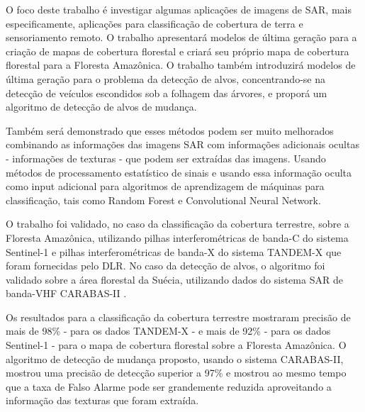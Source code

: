 O foco deste trabalho é investigar algumas aplicações de imagens de SAR, mais especificamente, aplicações para classificação de cobertura de terra e sensoriamento remoto.
O trabalho apresentará modelos de última geração para a criação de mapas de cobertura florestal e criará seu próprio mapa de cobertura florestal para a Floresta Amazônica.
O trabalho também introduzirá modelos de última geração para o problema da detecção de alvos, concentrando-se na detecção de veículos escondidos sob a folhagem das árvores, e proporá um algoritmo de detecção de alvos de mudança.

Também será demonstrado que esses métodos podem ser muito melhorados combinando as informações das imagens SAR com informações adicionais ocultas - informações de texturas - que podem ser extraídas das imagens.
Usando métodos de processamento estatístico de sinais e usando essa informação oculta como input adicional para algoritmos de aprendizagem de máquinas para classificação, tais como Random Forest e Convolutional Neural Network. 

O trabalho foi validado, no caso da classificação da cobertura terrestre, sobre a Floresta Amazônica, utilizando pilhas interferométricas de banda-C do sistema Sentinel-1 e pilhas interferométricas de banda-X do sistema TANDEM-X que foram fornecidas pelo DLR.
No caso da detecção de alvos, o algoritmo foi validado sobre a área florestal da Suécia, utilizando dados do sistema SAR de banda-VHF CARABAS-II .

Os resultados para a classificação da cobertura terrestre mostraram precisão de mais de 98\% - para os dados TANDEM-X - e mais de 92\% - para os dados Sentinel-1 - para o mapa de cobertura florestal sobre a Floresta Amazônica.
O algoritmo de detecção de mudança proposto, usando o sistema CARABAS-II, mostrou uma precisão de detecção superior a 97\% e mostrou ao mesmo tempo que a taxa de Falso Alarme pode ser grandemente reduzida aproveitando a informação das texturas que foram extraída.
